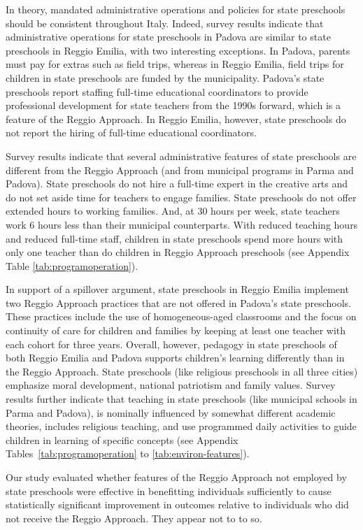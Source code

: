 In theory, mandated administrative operations and policies for state preschools should be consistent throughout Italy. Indeed, survey results indicate that administrative operations for state preschools in Padova are similar to state preschools in Reggio Emilia, with two interesting exceptions. In Padova, parents must pay for extras such as field trips, whereas in Reggio Emilia, field trips for children in state preschools are funded by the municipality. Padova's state preschools report staffing full-time educational coordinators to provide professional development for state teachers from the 1990s forward, which is a feature of the Reggio Approach. In Reggio Emilia, however, state preschools do not report the hiring of full-time educational coordinators. 

Survey results indicate that several administrative features of state preschools are different from the Reggio Approach (and from municipal programs in Parma and Padova). State preschools do not hire a full-time expert in the creative arts and do not set aside time for teachers to engage families. State preschools do not offer extended hours to working families. And, at 30 hours per week, state teachers work 6 hours less than their municipal counterparts. With reduced teaching hours and reduced full-time staff, children in state preschools spend more hours with only one teacher than do children in Reggio Approach preschools (see Appendix Table \ref{tab:programoperation}). 

In support of a spillover argument, state preschools in Reggio Emilia implement two Reggio Approach practices that are not offered in Padova's state preschools. These practices include the use of homogeneous-aged classrooms and the focus on continuity of care for children and families by keeping at least one teacher with each cohort for three years. Overall, however, pedagogy in state preschools of both Reggio Emilia and Padova  supports children's learning differently than in the Reggio Approach. State preschools (like religious preschools in all three cities) emphasize moral development, national patriotism and family values. Survey results further indicate that teaching in state preschools (like municipal schools in Parma and Padova), is nominally influenced by somewhat different academic theories, includes religious teaching, and use programmed daily activities to guide children in learning of specific concepts (see Appendix Tables~\ref{tab:programoperation} to \ref{tab:environ-features}). 

Our study evaluated whether features of the Reggio Approach not employed by state preschools were effective in benefitting individuals sufficiently to cause statistically significant improvement in outcomes relative to individuals who did not receive the Reggio Approach. They appear not to to so.

